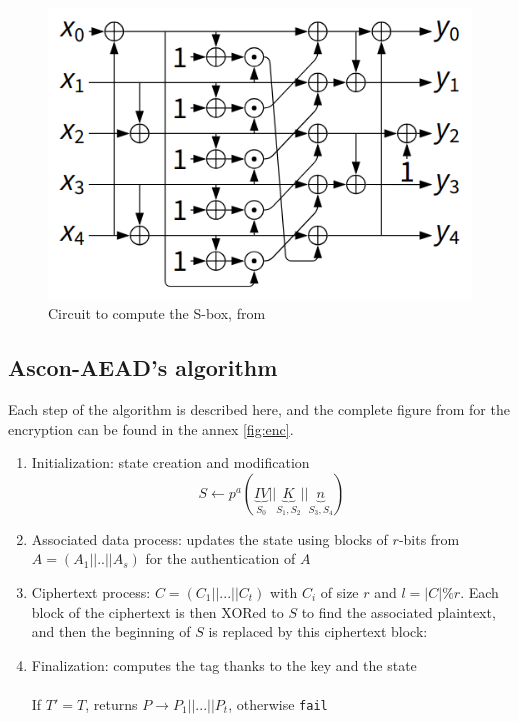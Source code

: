 \documentclass[11pt,technote]{IEEEtran}
\begin{document}
		\begin{figure}[H]
			\centering
			\includegraphics[scale=0.4]{img_files/circuit}
			\caption{Circuit to compute the S-box, from \cite{norme}}
			\label{circuit_sbox}
		\end{figure}
		
		
		\subsection{Ascon-AEAD's algorithm}
		Each step of the algorithm is described here, and the complete figure from \cite{cours_crypto} for the encryption can be found in the annex \ref{fig:enc}.
		
		\begin{enumerate}
		\item Initialization: state creation and modification
		$$S \leftarrow p^{a}( \underbrace{IV}_{S_0}||\underbrace{K}_{S_1,S_2}||\underbrace{n}_{S_3,S_4})$$
		
		\item Associated data process: updates the state using blocks of $r$-bits from $A=(A_1||..||A_s)$ for the authentication of $A$
		
		\item Ciphertext process: $C = (C_1 || ... || C_t)$ with $C_i$ of size $r$ and $l=|C| \% r$. Each block of the ciphertext is then XORed to $S$ to find the associated plaintext, and then the beginning of $S$ is replaced by this ciphertext block:\\
		
		\item Finalization: computes the tag thanks to the key and the state\\
		\\
		If $T'= T$, returns $P \rightarrow P_1 || ... || P_t$, otherwise \verb|fail|
		\end{enumerate}
		
\end{document}
